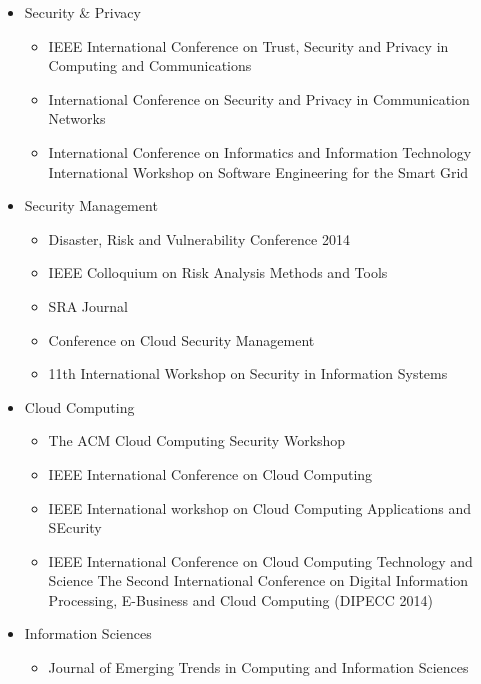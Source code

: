 \documentclass[a4paper,twoside,10pt]{report}
\begin{document}
\begin{itemize}

	\item Security \& Privacy	
	\begin{itemize}
		\item IEEE International Conference on Trust, Security and Privacy in Computing and Communications
		\item International Conference on Security and Privacy in Communication Networks
		\item International Conference on Informatics and Information Technology
		International Workshop on Software Engineering for the Smart Grid
	\end{itemize}
	
	\item Security Management
	\begin{itemize}
		\item Disaster, Risk and Vulnerability Conference 2014
		\item IEEE Colloquium on Risk Analysis Methods and Tools
		\item SRA Journal
		\item Conference on Cloud Security Management
		\item 11th International Workshop on Security in Information Systems 
	\end{itemize}
	
	\item Cloud Computing
	\begin{itemize}
		\item The ACM Cloud Computing Security Workshop
		\item IEEE International Conference on Cloud Computing
		\item IEEE International workshop on Cloud Computing Applications and SEcurity
		\item IEEE International Conference on Cloud Computing Technology and Science
		The Second International Conference on Digital Information Processing, E-Business and Cloud Computing (DIPECC 2014)
	\end{itemize}
	
	\item Information Sciences	
	\begin{itemize}
		\item Journal of Emerging Trends in Computing and Information Sciences 
	\end{itemize}
	
\end{itemize}
\end{document}
